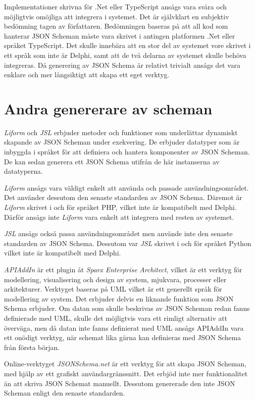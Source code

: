 Implementationer skrivna för .Net eller TypeScript ansågs vara svåra och möjligtvis omöjliga att integrera i systemet. Det är självklart en subjektiv bedömning tagen av författaren. Bedömningen baseras på att all kod som hanterar JSON Scheman måste vara skrivet i antingen platformen .Net eller språket TypeScript. Det skulle innebära att en stor del av systemet vore skrivet i ett språk som inte är Delphi, samt att de två delarna av systemet skulle behöva integreras. Då generering av JSON Schema är relativt trivialt ansågs det vara enklare och mer långsiktigt att skapa ett eget verktyg.

\section{Andra genererare av scheman}
\textit{Liform} och \textit{JSL} erbjuder metoder och funktioner som underlättar dynamiskt skapande av JSON Scheman under exekvering. De erbjuder datatyper som är inbyggda i språket för att definiera och hantera komponenter av JSON Scheman. De kan sedan generera ett JSON Schema utifrån de här instanserna av datatyperna. \cite{Romanovich,Limenius}

\textit{Liform} ansågs vara väldigt enkelt att använda och passade användningsområdet. Det använder dessutom den senaste standarden av JSON Schema. Däremot är \textit{Liform} skrivet i och för språket PHP, vilket inte är kompatibelt med Delphi. Därför ansågs inte \textit{Liform} vara enkelt att integrera med resten av systemet.

\textit{JSL} ansågs också passa användningsområdet men använde inte den senaste standarden av JSON Schema. Dessutom var \textit{JSL} skrivet i och för språket Python vilket inte är kompatibelt med Delphi.

\textit{APIAddIn} är ett plugin åt \textit{Sparx Enterprise Architect}, vilket är ett verktyg för modellering, visualisering och design av system, mjukvara, processer eller arkitekturer. Verktyget baseras på UML vilket är ett generellt språk för modellering av system. Det erbjuder delvis en liknande funktion som JSON Schema erbjuder. Om datan som skulle beskrivas av JSON Scheman redan fanns definierade med UML, skulle det möjligtvis vara ett rimligt alternativ att överväga, men då datan inte fanns definierat med UML ansågs APIAddIn vara ett onödigt verktyg, när schemat lika gärna kan definieras med JSON Schema från första början. \cite{Tomlinson}

Online-verktyget \textit{JSONSchema.net} är ett verktyg för att skapa JSON Scheman, med hjälp av ett grafiskt användargränssnitt. Det erbjöd inte mer funktionalitet än att skriva JSON Schemat manuellt. Dessutom genererade den inte JSON Scheman enligt den senaste standarden. \cite{Jackwootton}

